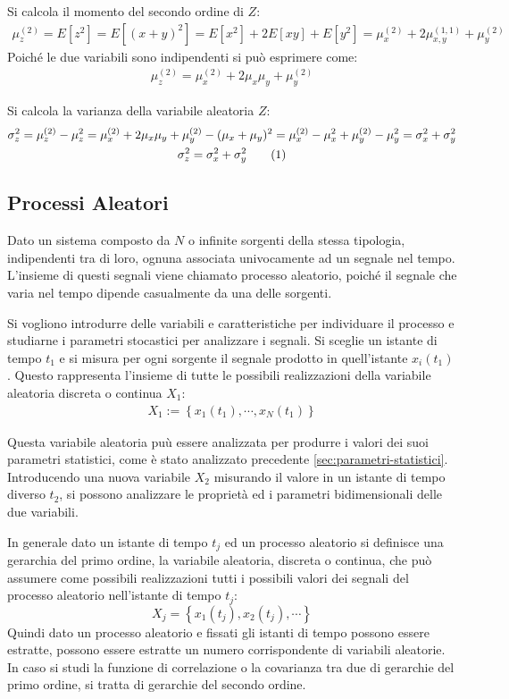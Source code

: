 \documentclass{article}
\newcommand{\tageq}{\tag{\stepcounter{equation}\theequation}}
\numberwithin{equation}{subsection}
\begin{document}
Si calcola il momento del secondo ordine di $Z$:
\begin{gather*}
    \mu_z^{(2)}=E[z^2]=E[(x+y)^2]=E[x^2]+2E[xy]+E[y^2]=\mu_x^{(2)}+2\mu_{x,y}^{(1,1)}+\mu_y^{(2)}
\end{gather*}
Poiché le due variabili sono indipendenti si può esprimere come:
\begin{gather}
    \mu_z^{(2)}=\mu_x^{(2)}+2\mu_x\mu_y+\mu_y^{(2)}
\end{gather}

Si calcola la varianza della variabile aleatoria $Z$:
\begin{gather*}
    \sigma_z^2=\mu_z^{(2)}-\mu_z^2=\mu_x^{(2)}+2\mu_x\mu_y+\mu_y^{(2)}-(\mu_x+\mu_y)^2=\mu_x^{(2)}-\mu_x^2+\mu_y^{(2)}-\mu_y^2=\sigma_x^2+\sigma_y^2\\
    \sigma_z^2=\sigma_x^2+\sigma_y^2\tageq
\end{gather*}

\subsection{Processi Aleatori}

Dato un sistema composto da $N$ o infinite sorgenti della stessa tipologia, indipendenti tra di loro, ognuna associata univocamente ad un segnale nel tempo. L'insieme di questi 
segnali viene chiamato processo aleatorio, poiché il segnale che varia nel tempo dipende casualmente da una delle sorgenti. 

Si vogliono introdurre delle variabili e caratteristiche per individuare il processo e studiarne i parametri stocastici per analizzare i segnali. 
Si sceglie un istante di tempo $t_1$ e si misura per ogni sorgente il segnale prodotto in quell'istante $x_i(t_1)$. Questo rappresenta l'insieme di tutte le possibili realizzazioni della variabile 
aleatoria discreta o continua $X_1$:
\begin{gather*}
    X_1:=\left\{x_1(t_1),\cdots,x_N(t_1)\right\}
\end{gather*}

Questa variabile aleatoria puù essere analizzata per produrre i valori dei suoi parametri statistici, come è stato analizzato precedente \ref{sec:parametri-statistici}. 
Introducendo una nuova variabile $X_2$ misurando il valore in un istante di tempo diverso $t_2$, si possono analizzare le proprietà ed i parametri bidimensionali 
delle due variabili. 

In generale dato un istante di tempo $t_j$ ed un processo aleatorio si definisce una gerarchia del primo ordine, la variabile aleatoria, discreta o continua, che può 
assumere come possibili realizzazioni tutti i possibili valori dei segnali del processo aleatorio nell'istante di tempo $t_j$:
\begin{equation}
    X_j=\left\{x_1(t_j),x_2(t_j),\cdots\right\}
\end{equation}
Quindi dato un processo aleatorio e fissati gli istanti di tempo possono essere estratte, possono essere estratte un numero corrispondente di variabili aleatorie. 
In caso si studi la funzione di correlazione o la covarianza tra due di gerarchie del primo ordine, si tratta di gerarchie del secondo ordine. 
\end{document}
